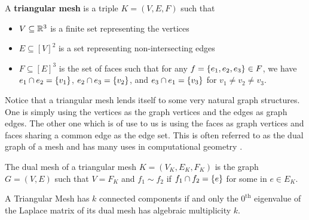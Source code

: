 \documentclass[12pt]{article}
\begin{document}
\begin{definition}
    \label{def:tri_mesh}
    A \textbf{triangular mesh} is a triple $K = (V, E, F)$ such that
    \begin{itemize}
        \item $V \subseteq \mathbb{R}^3$ is a finite set representing the vertices
        \item $E \subseteq [V]^2$ is a set representing non-intersecting edges
        \item $F \subseteq [E]^3$ is the set of faces such that for any $f = \qty{e_1, e_2, e_3} \in F$, we have $e_1 \cap e_2 = \qty{v_1}$, $e_2 \cap e_3 = \qty{v_2}$, and $e_3 \cap e_1 = \qty{v_3}$ for $v_1 \neq v_2 \neq v_3$. 
    \end{itemize}
\end{definition}

Notice that a triangular mesh lends itself to some very natural graph structures. One is simply using the vertices as the graph vertices and the edges as graph edges. The other one which is of use to us is using the faces as graph vertices and faces sharing a common edge as the edge set. This is often referred to as the dual graph of a mesh and has many uses in computational geometry \cite{kimSpectralCodingThreeDimensional2005}.

\begin{definition}
    The dual mesh of a triangular mesh $K = (V_K, E_K, F_K)$ is the graph $G = (V, E)$ such that $V = F_K$ and $f_1 \sim f_2$ if $f_1 \cap f_2 = \qty{e}$ for some in $e \in E_K$.
\end{definition}

\begin{theorem}
    A Triangular Mesh has $k$ connected components if and only the $0^\text{th}$ eigenvalue of the Laplace matrix of its dual mesh has algebraic multiplicity $k$.
\end{theorem}

\newpage
\nocite{merrisLaplacianMatricesGraphs1994}
\printbibliography
\end{document}
